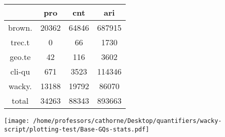 \documentclass[a4,10pt]{article}
\begin{document}
\begin{sidewaystable}[p]
\tiny{\begin{tabular}{|c|c|c|c|}
 & pro & cnt & ari\\
\hline
brown. & 20362 & 64846 & 687915\\
trec.t & 0 & 66 & 1730\\
geo.te & 42 & 116 & 3602\\
cli-qu & 671 & 3523 & 114346\\
wacky. & 13188 & 19792 & 86070\\
\hline
total & 34263 & 88343 & 893663
\end{tabular}}
\end{sidewaystable}



\vspace{0.2cm}

\begin{center}
\texttt{[image: /home/professors/cathorne/Desktop/quantifiers/wacky-script/plotting-test/Base-GQs-stats.pdf]}
\end{center}
\end{document}
